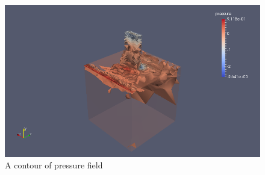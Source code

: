 \documentclass{article}
\begin{document}
\begin{figure}[h!]
  \centering
    \includegraphics[width=1\textwidth]{res2}
  \caption{A contour of pressure field}
\end{figure}

\pagebreak
\end{document}

